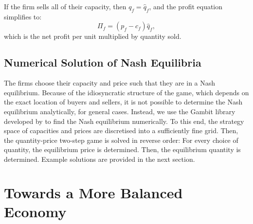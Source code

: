 \documentclass[final,3p,times,authoryear,12pt]{elsarticle}
\begin{document}
If the firm sells all of their capacity, then $q_f = \hat q_f$, and the profit equation simplifies to:
\begin{equation}
    \Pi_f = (p_f- c_f) \hat q_f,
\end{equation}
which is the net profit per unit multiplied by quantity sold.

\subsection{Numerical Solution of Nash Equilibria}

The firms choose their capacity and price such that they are in a Nash equilibrium. 
Because of the idiosyncratic structure of the game, which depends on the exact location of buyers and sellers, 
it is not possible to determine the Nash equilibrium analytically, for general cases. 
Instead, we use the Gambit library developed by  \cite{gambitPython} to find the Nash equilibrium numerically. 
To this end, the strategy space of capacities and prices are discretised into a sufficiently fine grid. 
Then, the quantity-price two-step game is solved in reverse order: 
For every choice of quantity, the equilibrium price is determined.
Then, the equilibrium quantity is determined. 
Example solutions are provided in the next section. 

\section{Towards a More Balanced Economy}
\label{sec:static_game}
\end{document}
